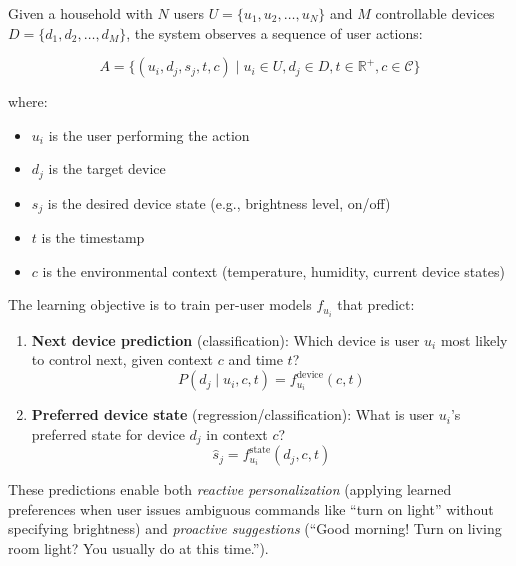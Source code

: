Given a household with $N$ users $U = \{u_1, u_2, \ldots, u_N\}$ and $M$ controllable devices $D = \{d_1, d_2, \ldots, d_M\}$, the system observes a sequence of user actions:

\begin{equation}
    A = \{(u_i, d_j, s_j, t, c) \mid u_i \in U, d_j \in D, t \in \mathbb{R}^+, c \in \mathcal{C}\}
\end{equation}

where:
\begin{itemize}
    \item $u_i$ is the user performing the action
    \item $d_j$ is the target device
    \item $s_j$ is the desired device state (e.g., brightness level, on/off)
    \item $t$ is the timestamp
    \item $c$ is the environmental context (temperature, humidity, current device states)
\end{itemize}

The learning objective is to train per-user models $f_{u_i}$ that predict:

\begin{enumerate}
    \item \textbf{Next device prediction} (classification): Which device is user $u_i$ most likely to control next, given context $c$ and time $t$?
    \begin{equation}
        P(d_j \mid u_i, c, t) = f_{u_i}^{\text{device}}(c, t)
    \end{equation}
    
    \item \textbf{Preferred device state} (regression/classification): What is user $u_i$'s preferred state for device $d_j$ in context $c$?
    \begin{equation}
        \hat{s}_j = f_{u_i}^{\text{state}}(d_j, c, t)
    \end{equation}
\end{enumerate}

These predictions enable both \emph{reactive personalization} (applying learned preferences when user issues ambiguous commands like ``turn on light'' without specifying brightness) and \emph{proactive suggestions} (``Good morning! Turn on living room light? You usually do at this time.'').


